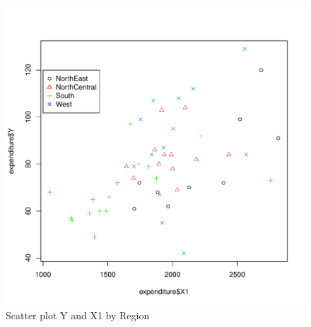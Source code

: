 \documentclass[12pt,letterpaper]{article}
\begin{document}
\begin{figure}[h!]\centering
	
	\caption{\footnotesize Scatter plot Y and X1 by Region}
	\label{fig:plot_4}
	\includegraphics[width=.75\textwidth]{YbyX1Region.pdf}

\end{figure}
\end{document}
